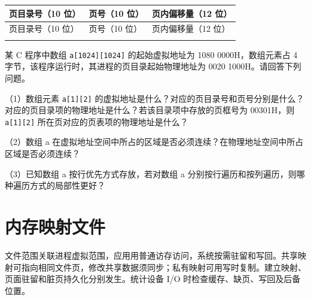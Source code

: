 \par\smallskip
{\fontsize{9.3}{12}\selectfont\setlength{\tabcolsep}{2.5pt}\setlength{\LTleft}{0pt}\setlength{\LTright}{0pt}
\begin{longtable}{@{}>{\raggedright\arraybackslash}p{}>{\raggedright\arraybackslash}p{}>{\raggedright\arraybackslash}p{}@{}}
\toprule
页目录号（10 位） & 页号（10 位） & 页内偏移量（12 位） \\

\midrule\endfirsthead\toprule
页目录号（10 位） & 页号（10 位） & 页内偏移量（12 位） \\

\midrule\endhead\bottomrule\endfoot
\end{longtable}}
\par\smallskip

某 C 程序中数组 \texttt{a[\allowbreak{}1024]\allowbreak{}[\allowbreak{}1024]\allowbreak{}} 的起始虚拟地址为 1080 0000H，数组元素占 4 字节，该程序运行时，其进程的页目录起始物理地址为 0020 1000H。请回答下列问题。

（1）数组元素 \texttt{a[\allowbreak{}1]\allowbreak{}[\allowbreak{}2]\allowbreak{}} 的虚拟地址是什么？对应的页目录号和页号分别是什么？对应的页目录项的物理地址是什么？若该目录项中存放的页框号为 00301H，则 \texttt{a[\allowbreak{}1]\allowbreak{}[\allowbreak{}2]\allowbreak{}} 所在页对应的页表项的物理地址是什么？

（2）数组 a 在虚拟地址空间中所占的区域是否必须连续？在物理地址空间中所占区域是否必须连续？

（3）已知数组 a 按行优先方式存放，若对数组 a 分别按行遍历和按列遍历，则哪种遍历方式的局部性更好？

\section{内存映射文件}\label{OS03-mmap}

文件范围关联进程虚拟范围，应用用普通访存访问，系统按需驻留和写回。共享映射可指向相同文件页，修改共享数据须同步；私有映射可用写时复制。建立映射、页面驻留和脏页持久化分别发生。统计设备 I/O 时检查缓存、缺页、写回及后备位置。
